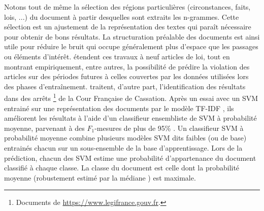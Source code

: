 Notons tout de même la sélection des régions particulières (circonstances, faits, lois, ...) du document à partir desquelles sont extraits les n-grammes. Cette sélection est un ajustement de la représentation des textes qui paraît nécessaire pour obtenir de bons résultats. La structuration préalable des documents est ainsi utile pour réduire le bruit qui occupe généralement plus d'espace que les passages ou éléments d'intérêt.  \citet{medvedeva2018echrCristalBall} étendent ces travaux à neuf articles de loi, tout en montrant empiriquement, entre autres, la possibilité de prédire la violation des articles sur des périodes futures à celles couvertes par les données utilisées lors des phases d'entraînement. \cite{sulea2017legalEnsSVM} traitent, d'autre part, l'identification des résultats dans des arrêts \footnote{Documents de \url{https://www.legifrance.gouv.fr}.} de la Cour Française de Cassation. Après un essai \citep{Sulea2017predictareadecision} avec un SVM entrainé sur une représentation des documents par le modèle  TF-IDF \citep{salton1988term-weighting}, ils améliorent les résultats à l'aide d'un classifieur ensembliste de SVM à probabilité moyenne,
 parvenant à des $F_1$-mesures de plus de 95\% \cite{sulea2017legalEnsSVM}. Un classifieur SVM à probabilité moyenne combine plusieurs modèles SVM dits \og faibles \fg{} (ou de base)  entrainés chacun sur un sous-ensemble de la base d'apprentissage.
Lors de la prédiction, chacun des SVM estime une probabilité d'appartenance du document classifié à chaque classe. La classe du document est celle dont la  probabilité moyenne (robustement estimé par la médiane \citep{kittler1998combiningClassifiers}) est maximale.

